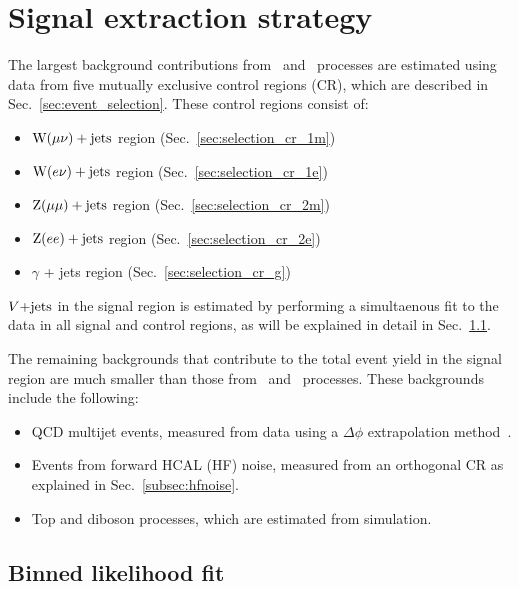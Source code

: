 \section{Signal extraction strategy}
\label{sec:signal_extraction}

\newcommand\tfPlotDir{TransferFactors/merged_2023-04-08_vbfhinv_full_analysis_NLO_VJets_09Apr23_thesis_v1}

The largest background contributions from \Zvvjets~and \Wlvjets~processes
are estimated using data from five mutually exclusive control regions (CR), which are described in
Sec.~\ref{sec:event_selection}. These control regions consist of:

\begin{itemize}
  \item $\mathrm{W}(\mu\nu)+\textrm{jets}$ region (Sec.~\ref{sec:selection_cr_1m})
  \item $\mathrm{W}(e\nu)+\textrm{jets}$ region (Sec.~\ref{sec:selection_cr_1e})
  \item $\mathrm{Z}(\mu\mu)+\textrm{jets}$ region (Sec.~\ref{sec:selection_cr_2m})
  \item $\mathrm{Z}(ee)+\textrm{jets}$ region (Sec.~\ref{sec:selection_cr_2e})
  \item $\gamma$ + jets region (Sec.~\ref{sec:selection_cr_g})
\end{itemize}

$V\text{+jets}$ in the signal region is estimated by performing a simultaenous fit to the data 
in all signal and control regions, as will be explained in detail in Sec.~\ref{subsec:likelihood_fit}.

The remaining backgrounds that contribute to the total event yield in the signal region
are much smaller than those from \Zvvjets~and \Wlvjets~processes. These backgrounds
include the following: 

\begin{itemize}
    \item QCD multijet events, measured from data using a $\Delta\phi$ extrapolation method~\cite{VBFHinvAnalysisPaper}.
    \item Events from forward HCAL (HF) noise, measured from an orthogonal CR as explained in Sec.~\ref{subsec:hfnoise}.
    \item Top and diboson processes, which are estimated from simulation.
\end{itemize}

\subsection{Binned likelihood fit}
\label{subsec:likelihood_fit}

